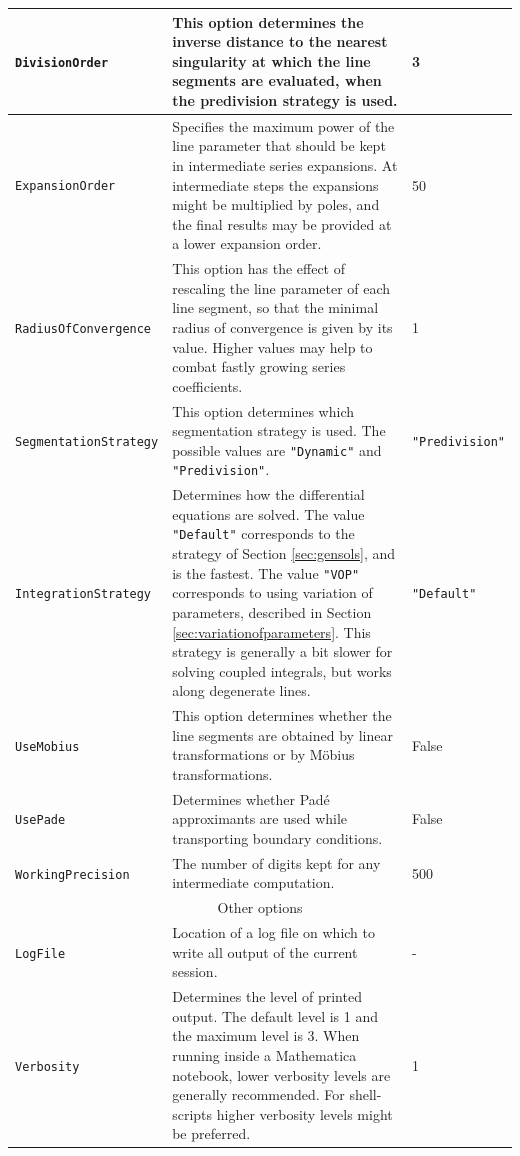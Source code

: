 \documentclass{article}
\newcommand\xrowht[2][0]{\addstackgap[.5\dimexpr#2\relax]{\vphantom{#1}}}
\begin{document}
\begin{tabularx}{\textwidth}{ | l | X | l |}
\texttt{DivisionOrder} & This option determines the inverse distance to the nearest singularity at which the line segments are evaluated, when the predivision strategy is used. & 3 \\\hline
\texttt{ExpansionOrder} & Specifies the maximum power of the line parameter that should be kept in intermediate series expansions. At intermediate steps the expansions might be multiplied by poles, and the final results may be provided at a lower expansion order. & 50 \\\hline
\texttt{RadiusOfConvergence} & This option has the effect of rescaling the line parameter of each line segment, so that the minimal radius of convergence is given by its value. Higher values may help to combat fastly growing series coefficients. & 1 \\\hline
\texttt{SegmentationStrategy} & This option determines which segmentation strategy is used. The possible values are \texttt{"Dynamic"} and \texttt{"Predivision"}. & \texttt{"Predivision"} \\\hline
\texttt{IntegrationStrategy} & Determines how the differential equations are solved. The value \texttt{"Default"} corresponds to the strategy of Section \ref{sec:gensols}, and is the fastest. The value \texttt{"VOP"} corresponds to using variation of parameters, described in Section \ref{sec:variationofparameters}. This strategy is generally a bit slower for solving coupled integrals, but works along degenerate lines. & \texttt{"Default"} \\\hline
\texttt{UseMobius} & This option determines whether the line segments are obtained by linear transformations or by Möbius transformations. & False \\\hline
\texttt{UsePade} & Determines whether Padé approximants are used while transporting boundary conditions. & False \\\hline
\texttt{WorkingPrecision} & The number of digits kept for any intermediate computation. & 500 \\\hline
\multicolumn{3}{|c|}{Other options \xrowht[()]{10pt}}  \\\hline 
\texttt{LogFile} & Location of a log file on which to write all output of the current session. & - \\\hline
\texttt{Verbosity} & Determines the level of printed output. The default level is 1 and the maximum level is 3. When running inside a Mathematica notebook, lower verbosity levels are generally recommended. For shell-scripts higher verbosity levels might be preferred. & 1\\\hline
\end{tabularx}
\end{document}
